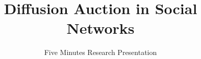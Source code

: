 \documentclass{beamer}
\title[Diffusion Auction in Social Networks]{Diffusion Auction in Social Networks} %
\author{Five Minutes Research Presentation} %
\institute[] %
{
\medskip
\textit{} %
}
\date{} %
\begin{document}
\begin{frame}
\titlepage %
\end{frame}




\end{document}
